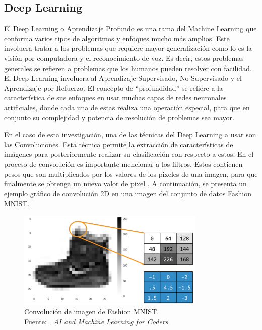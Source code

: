 \subsection{Deep Learning}

El Deep Learning o Aprendizaje Profundo es una rama del Machine Learning que conforma varios tipos de algoritmos y enfoques mucho más amplios. Este involucra tratar a los problemas que requiere mayor generalización como lo es la visión por computadora y el reconocimiento de voz. Es decir, estos problemas generales se refieren a problemas que los humanos pueden resolver con facilidad. El Deep Learning involucra al Aprendizaje Supervisado, No Supervisado y el Aprendizaje por Refuerzo. El concepto de “profundidad” se refiere a la característica de sus enfoques en usar muchas capas de redes neuronales artificiales, donde cada una de estas realiza una operación especial, para que en conjunto su complejidad y potencia de resolución de problemas sea mayor. \parencite{bk_hurbans2020grokking}

En el caso de esta investigación, una de las técnicas del Deep Learning a usar son las Convoluciones. Esta técnica permite la extracción de características de imágenes para posteriormente realizar su clasificación con respecto a estos. En el proceso de convolución es importante mencionar a los filtros. Estos contienen pesos que son multiplicados por los valores de los pixeles de una imagen, para que finalmente se obtenga un nuevo valor de pixel \parencite{bk_moroney2020aiandml}. A continuación, se presenta un ejemplo gráfico de convolución 2D en una imagen del conjunto de datos Fashion MNIST.

\begin{figure}[H]
	\begin{center}
		\includegraphics[width=0.80\textwidth]{2/figures/cnn_fash_mnist.png}
		\caption[Convolución de imagen de Fashion MNIST]{Convolución de imagen de Fashion MNIST. \\
		Fuente: \cite{bk_moroney2020aiandml}. \textit{AI and Machine Learning for Coders}.}
		\label{2:fig201}
	\end{center}
\end{figure}


